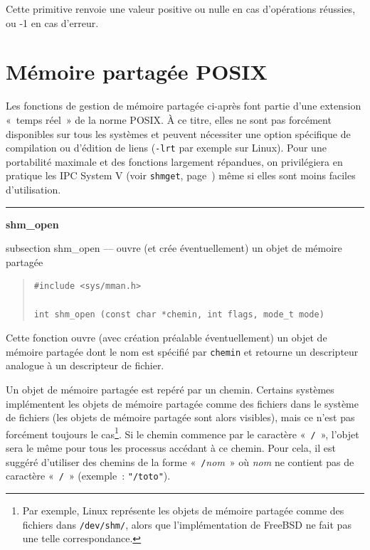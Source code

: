 \documentclass [twoside] {report}
\newcommand {\primitive} [1]
    {
	\phantomsection
	{\large \textbf {#1}}
	\addcontentsline {toc} {subsection} {#1}
    }
\newcommand {\separation}
    {
	\vspace {5mm}
	\nopagebreak
	\hrule
    }
\begin{document}
Cette primitive renvoie une valeur positive ou nulle en cas
d'opérations réussies, ou -1 en cas d'erreur.



\section {Mémoire partagée POSIX}

Les fonctions de gestion de mémoire partagée ci-après font partie d'une
extension «~temps réel~» de la norme POSIX. À ce titre, elles
ne sont pas forcément disponibles sur tous les systèmes et peuvent
nécessiter une option spécifique de compilation ou d'édition de liens
(\verb|-lrt| par exemple sur Linux). Pour une portabilité maximale et
des fonctions largement répandues, on privilégiera en pratique les
IPC System V (voir \texttt {shmget}, page~\pageref {shmget}) même si
elles sont moins faciles d'utilisation.



\separation
\primitive {shm\_open} --- ouvre (et crée éventuellement) un objet de mémoire partagée

\begin {quote}
\begin {verbatim}
#include <sys/mman.h>

int shm_open (const char *chemin, int flags, mode_t mode)
\end{verbatim}
\end {quote}

Cette fonction ouvre (avec création préalable éventuellement)
un objet de mémoire partagée dont le nom est spécifié par \texttt
{chemin} et retourne un descripteur analogue à un descripteur de
fichier.

Un objet de mémoire partagée est repéré par un chemin.  Certains
systèmes implémentent les objets de mémoire partagée comme
des fichiers dans le système de fichiers (les objets de mémoire
partagée sont alors visibles), mais ce n'est pas forcément toujours
le cas\footnote {Par exemple, Linux représente les objets de mémoire
partagée comme des fichiers dans \texttt {/dev/shm/}, alors que
l'implémentation de FreeBSD ne fait pas une telle correspondance.}.
Si le chemin commence par le caractère «~\texttt {/}~», l'objet sera
le même pour tous les processus accédant à ce chemin. Pour cela, il
est suggéré d'utiliser des chemins de la forme «~\texttt {/}\textit
{nom}~» où \textit {nom} ne contient pas de caractère «~\texttt {/}~»
(exemple~: \verb|"/toto"|).
\end{document}
